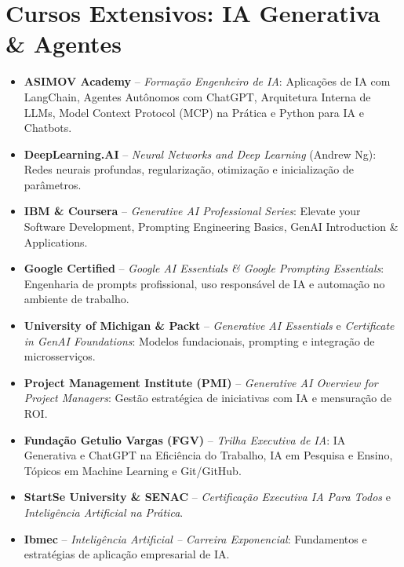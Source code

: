 \documentclass[singlesided,
               paper=a4,
               fontsize=9.5pt
              ]{my-resume}
\begin{document}
{    \section[\faBook]{Cursos Extensivos: IA Generativa \& Agentes}
    \begin{itemize}
        \item \textbf{ASIMOV Academy} -- \textit{Forma\c{c}\~{a}o Engenheiro de IA}: Aplica\c{c}\~{o}es de IA com LangChain, Agentes Aut\^{o}nomos com ChatGPT, Arquitetura Interna de LLMs, Model Context Protocol (MCP) na Pr\'{a}tica e Python para IA e Chatbots.
        \item \textbf{DeepLearning.AI} -- \textit{Neural Networks and Deep Learning} (Andrew Ng): Redes neurais profundas, regulariza\c{c}\~{a}o, otimiza\c{c}\~{a}o e inicializa\c{c}\~{a}o de par\^{a}metros.
        \item \textbf{IBM \& Coursera} -- \textit{Generative AI Professional Series}: Elevate your Software Development, Prompting Engineering Basics, GenAI Introduction \& Applications.
        \item \textbf{Google Certified} -- \textit{Google AI Essentials \& Google Prompting Essentials}: Engenharia de prompts profissional, uso respons\'{a}vel de IA e automa\c{c}\~{a}o no ambiente de trabalho.
        \item \textbf{University of Michigan \& Packt} -- \textit{Generative AI Essentials} e \textit{Certificate in GenAI Foundations}: Modelos fundacionais, prompting e integra\c{c}\~{a}o de microsservi\c{c}os.
        \item \textbf{Project Management Institute (PMI)} -- \textit{Generative AI Overview for Project Managers}: Gest\~{a}o estrat\'{e}gica de iniciativas com IA e mensura\c{c}\~{a}o de ROI.
        \item \textbf{Funda\c{c}\~{a}o Getulio Vargas (FGV)} -- \textit{Trilha Executiva de IA}: IA Generativa e ChatGPT na Efici\^{e}ncia do Trabalho, IA em Pesquisa e Ensino, T\'{o}picos em Machine Learning e Git/GitHub.
        \item \textbf{StartSe University \& SENAC} -- \textit{Certifica\c{c}\~{a}o Executiva IA Para Todos} e \textit{Intelig\^{e}ncia Artificial na Pr\'{a}tica}.
        \item \textbf{Ibmec} -- \textit{Intelig\^{e}ncia Artificial -- Carreira Exponencial}: Fundamentos e estrat\'{e}gias de aplica\c{c}\~{a}o empresarial de IA.
    \end{itemize}
}

\makebody
\clearpage
\end{document}
